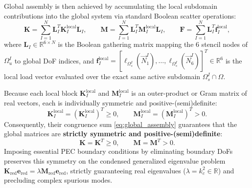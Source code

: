 \documentclass[preprint,12pt]{elsarticle}
\begin{document}
Global assembly is then achieved by accumulating the local subdomain contributions into the global system via standard Boolean scatter operations:
\begin{equation}
    \mathbf{K} = \sum_{I=1}^N \mathbf{L}_I^T \mathbf{K}_I^{\mathrm{local}} \mathbf{L}_I, \qquad \mathbf{M} = \sum_{I=1}^N \mathbf{L}_I^T \mathbf{M}_I^{\mathrm{local}} \mathbf{L}_I, \qquad \mathbf{F} = \sum_{I=1}^N \mathbf{L}_I^T \mathbf{f}_I^{\mathrm{local}},
    \label{eq:global_assembly}
\end{equation}
where $\mathbf{L}_I \in \mathbb{R}^{6 \times N}$ is the Boolean gathering matrix mapping the 6 stencil nodes of $\Omega_u^I$ to global DoF indices, and $\mathbf{f}_I^{\mathrm{local}} = [\ell_{\Omega_s^I}(\vec{N}_1^I), \dots, \ell_{\Omega_s^I}(\vec{N}_6^I)]^T \in \mathbb{R}^6$ is the local load vector evaluated over the exact same active subdomain $\Omega_s^I \cap \Omega$.

Because each local block $\mathbf{K}_I^{\mathrm{local}}$ and $\mathbf{M}_I^{\mathrm{local}}$ is an outer-product or Gram matrix of real vectors, each is individually symmetric and positive-(semi)definite:
\begin{equation}
    \mathbf{K}_I^{\mathrm{local}} = (\mathbf{K}_I^{\mathrm{local}})^T \ge 0, \qquad \mathbf{M}_I^{\mathrm{local}} = (\mathbf{M}_I^{\mathrm{local}})^T > 0.
\end{equation}
Consequently, their congruence sum \eqref{eq:global_assembly} guarantees that the global matrices are \textbf{strictly symmetric and positive-(semi)definite}:
\begin{equation}
    \mathbf{K} = \mathbf{K}^T \ge 0, \qquad \mathbf{M} = \mathbf{M}^T > 0.
    \label{eq:symmetric_global_properties}
\end{equation}
Imposing essential PEC boundary conditions by eliminating boundary DoFs preserves this symmetry on the condensed generalized eigenvalue problem $\mathbf{K}_{\mathrm{red}} \mathbf{e}_{\mathrm{red}} = \lambda \mathbf{M}_{\mathrm{red}} \mathbf{e}_{\mathrm{red}}$, strictly guaranteeing real eigenvalues ($\lambda = k_c^2 \in \mathbb{R}$) and precluding complex spurious modes.
\end{document}
